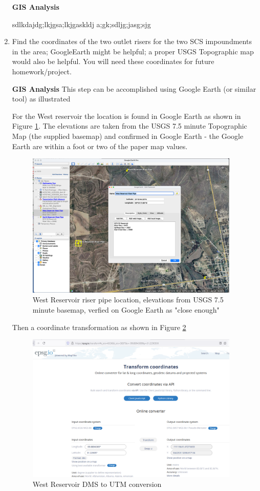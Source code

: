 \documentclass[12pt]{article}
\begin{document}
\begin{enumerate}
\textbf{GIS Analysis}

sdlkdajdg;lkjgsa;lkjgaskldj
a;gk;sdljg;jasg;sjg

\clearpage

\item Find the coordinates of the two outlet risers for the two SCS impoundments in the area; GoogleEarth might be helpful; a proper USGS Topographic map would also be helpful.  You will need these coordinates for future homework/project.

\textbf{GIS Analysis}
This step can be accomplished using Google Earth (or similar tool) as illustrated

For the West reservoir the location is found in Google Earth as shown in Figure \ref{fig:WestBasin}.  The elevations are taken from the USGS 7.5 minute Topographic Map (the supplied basemap) and confirmed in Google Earth - the Google Earth are within a foot or two of the paper map values.

\begin{figure}[h!] %
   \centering
   \includegraphics[width=4in]{WestReservoir.png} 
   \caption{West Reservoir riser pipe location, elevations from USGS 7.5 minute basemap, verfied on Google Earth as "close enough"}
   \label{fig:WestBasin}
\end{figure}

Then a coordinate transformation as shown in Figure \ref{fig:WestCoordinates}

\begin{figure}[h!] %
   \centering
   \includegraphics[width=4in]{WestCoordinates.png} 
   \caption{West Reservoir DMS to UTM conversion}
   \label{fig:WestCoordinates}
\end{figure}


\end{enumerate}
\end{document}
